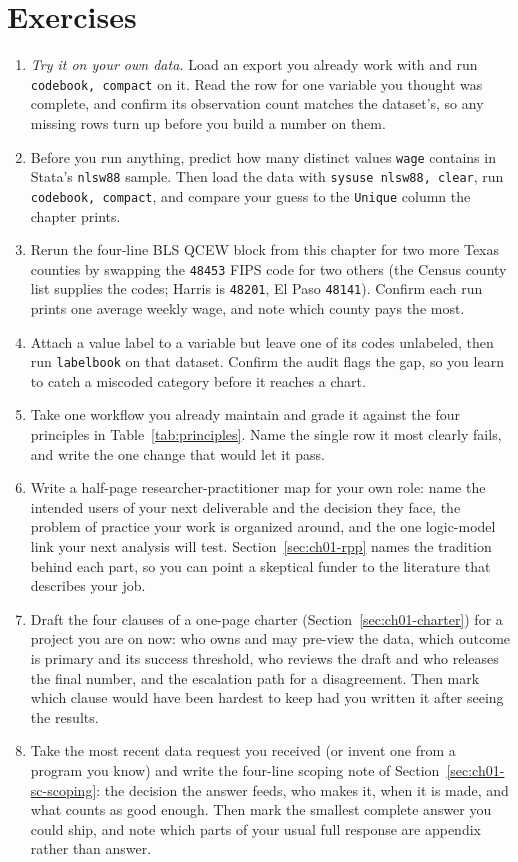 \section*{Exercises}
\begin{enumerate}
\item \emph{Try it on your own data.} Load an export you already work with and run \texttt{codebook, compact} on it. Read the row for one variable you thought was complete, and confirm its observation count matches the dataset's, so any missing rows turn up before you build a number on them.
\item Before you run anything, predict how many distinct values \texttt{wage} contains in Stata's \texttt{nlsw88} sample. Then load the data with \texttt{sysuse nlsw88, clear}, run \texttt{codebook, compact}, and compare your guess to the \texttt{Unique} column the chapter prints.
\item Rerun the four-line BLS QCEW block from this chapter for two more Texas counties by swapping the \texttt{48453} FIPS code for two others (the Census county list supplies the codes; Harris is \texttt{48201}, El Paso \texttt{48141}). Confirm each run prints one average weekly wage, and note which county pays the most.
\item Attach a value label to a variable but leave one of its codes unlabeled, then run \texttt{labelbook} on that dataset. Confirm the audit flags the gap, so you learn to catch a miscoded category before it reaches a chart.
\item Take one workflow you already maintain and grade it against the four principles in Table~\ref{tab:principles}. Name the single row it most clearly fails, and write the one change that would let it pass.
\item Write a half-page researcher-practitioner map for your own role: name the intended users of your next deliverable and the decision they face, the problem of practice your work is organized around, and the one logic-model link your next analysis will test. Section~\ref{sec:ch01-rpp} names the tradition behind each part, so you can point a skeptical funder to the literature that describes your job.
\item Draft the four clauses of a one-page charter (Section~\ref{sec:ch01-charter}) for a project you are on now: who owns and may pre-view the data, which outcome is primary and its success threshold, who reviews the draft and who releases the final number, and the escalation path for a disagreement. Then mark which clause would have been hardest to keep had you written it after seeing the results.
\item Take the most recent data request you received (or invent one from a program you know) and write the four-line scoping note of Section~\ref{sec:ch01-sc-scoping}: the decision the answer feeds, who makes it, when it is made, and what counts as good enough. Then mark the smallest complete answer you could ship, and note which parts of your usual full response are appendix rather than answer.
\end{enumerate}

